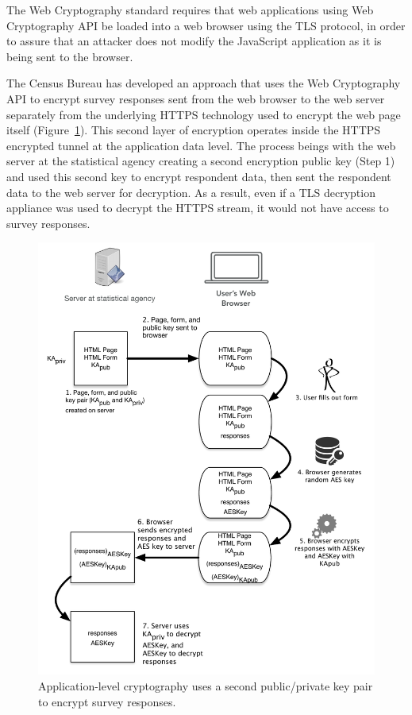 \documentclass[fleqn,12pt]{wlscirep}
\begin{document}
The Web Cryptography standard requires that web applications using Web
Cryptography API be loaded into a web browser using the TLS protocol, in
order to assure that an attacker does not modify the JavaScript
application as it is being sent to the browser.

The Census Bureau has developed an approach that uses the Web
Cryptography API to encrypt survey responses sent from the
web browser to the web server separately from the underlying HTTPS
technology used to encrypt the web page itself (Figure~\ref{app-level-diagram}). This second layer of encryption
operates inside the HTTPS encrypted tunnel at the application data
level. The process beings with the web server at the statistical
agency creating a second encryption public key (Step 1) and used this second
key to encrypt respondent data, then sent the respondent data to the
web server for decryption. As a result, even if a TLS decryption
appliance was used to decrypt the HTTPS stream, it would not have
access to survey responses.

\begin{figure}
  \includegraphics[width=\linewidth]{art/app-level-diagram}
  \caption{Application-level cryptography uses a second public/private
    key pair to encrypt survey responses.\label{app-level-diagram}}
\end{figure}
\end{document}
